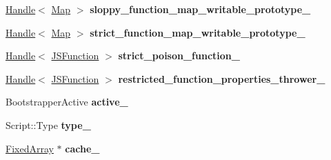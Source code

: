 \begin{DoxyCompactItemize}
\item 
\hyperlink{classv8_1_1internal_1_1_handle}{Handle}$<$ \hyperlink{classv8_1_1internal_1_1_map}{Map} $>$ {\bfseries sloppy\+\_\+function\+\_\+map\+\_\+writable\+\_\+prototype\+\_\+}\hypertarget{classv8_1_1internal_1_1_b_a_s_e___e_m_b_e_d_d_e_d_a90cb41b7ed3df5b5d682329af771ff11}{}\label{classv8_1_1internal_1_1_b_a_s_e___e_m_b_e_d_d_e_d_a90cb41b7ed3df5b5d682329af771ff11}

\item 
\hyperlink{classv8_1_1internal_1_1_handle}{Handle}$<$ \hyperlink{classv8_1_1internal_1_1_map}{Map} $>$ {\bfseries strict\+\_\+function\+\_\+map\+\_\+writable\+\_\+prototype\+\_\+}\hypertarget{classv8_1_1internal_1_1_b_a_s_e___e_m_b_e_d_d_e_d_a5ed82693ef1a58609675f542f79bf380}{}\label{classv8_1_1internal_1_1_b_a_s_e___e_m_b_e_d_d_e_d_a5ed82693ef1a58609675f542f79bf380}

\item 
\hyperlink{classv8_1_1internal_1_1_handle}{Handle}$<$ \hyperlink{classv8_1_1internal_1_1_j_s_function}{J\+S\+Function} $>$ {\bfseries strict\+\_\+poison\+\_\+function\+\_\+}\hypertarget{classv8_1_1internal_1_1_b_a_s_e___e_m_b_e_d_d_e_d_afe405d380cb4c27c1c12697bd00203d2}{}\label{classv8_1_1internal_1_1_b_a_s_e___e_m_b_e_d_d_e_d_afe405d380cb4c27c1c12697bd00203d2}

\item 
\hyperlink{classv8_1_1internal_1_1_handle}{Handle}$<$ \hyperlink{classv8_1_1internal_1_1_j_s_function}{J\+S\+Function} $>$ {\bfseries restricted\+\_\+function\+\_\+properties\+\_\+thrower\+\_\+}\hypertarget{classv8_1_1internal_1_1_b_a_s_e___e_m_b_e_d_d_e_d_ad14652ac98710abb774224b6dd7d4eaf}{}\label{classv8_1_1internal_1_1_b_a_s_e___e_m_b_e_d_d_e_d_ad14652ac98710abb774224b6dd7d4eaf}

\item 
Bootstrapper\+Active {\bfseries active\+\_\+}\hypertarget{classv8_1_1internal_1_1_b_a_s_e___e_m_b_e_d_d_e_d_a850e9c735422230c36b4f78425527b35}{}\label{classv8_1_1internal_1_1_b_a_s_e___e_m_b_e_d_d_e_d_a850e9c735422230c36b4f78425527b35}

\item 
Script\+::\+Type {\bfseries type\+\_\+}\hypertarget{classv8_1_1internal_1_1_b_a_s_e___e_m_b_e_d_d_e_d_a0ffea46e8f2ab41c218e68f9f1c37727}{}\label{classv8_1_1internal_1_1_b_a_s_e___e_m_b_e_d_d_e_d_a0ffea46e8f2ab41c218e68f9f1c37727}

\item 
\hyperlink{classv8_1_1internal_1_1_fixed_array}{Fixed\+Array} $\ast$ {\bfseries cache\+\_\+}\hypertarget{classv8_1_1internal_1_1_b_a_s_e___e_m_b_e_d_d_e_d_ae495b48ef5d32abc93abb2964c83937d}{}\label{classv8_1_1internal_1_1_b_a_s_e___e_m_b_e_d_d_e_d_ae495b48ef5d32abc93abb2964c83937d}


\end{DoxyCompactItemize}
